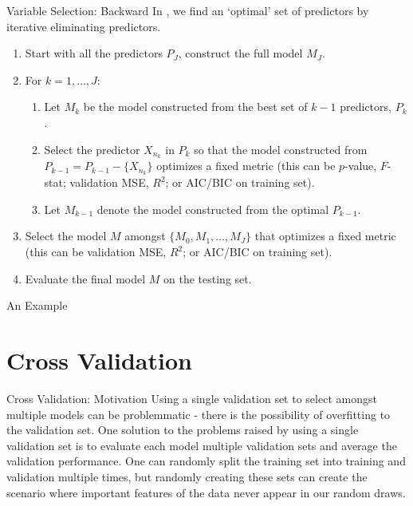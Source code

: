 \documentclass[12pt,t]{beamer}
\let\emph\relax %
\begin{document}
\begin{frame}{Variable Selection: Backward} \footnotesize
\vskip-0.4cm
In \emph{backward selection}, we find an `optimal' set of predictors by iterative eliminating predictors.
\vskip0.1cm
\begin{enumerate}
\item Start with all the predictors $P_J$, construct the full model $M_J$.
\vskip0.2cm
\item For $k = 1, \ldots, J$:
\begin{enumerate}
\item Let $M_{k}$ be the model constructed from the best set of $k-1$ predictors, $P_{k}$.
\vskip0.1cm 
\item Select the predictor $X_{n_{k}}$ in $P_{k}$ so that the model constructed from $P_{k-1} = P_{k-1}- \{X_{n_{k}}\}$ optimizes a fixed metric (this can be $p$-value, $F$-stat; validation MSE, $R^2$; or AIC/BIC on training set). 
\vskip0.1cm
\item Let $M_{k-1}$ denote the model constructed from the optimal $P_{k-1}$. 
\end{enumerate}
\item Select the model $M$ amongst $\{M_0, M_1, \ldots, M_J\}$ that optimizes a fixed metric (this can be validation MSE, $R^2$; or AIC/BIC on training set). 
\vskip0.2cm
\item Evaluate the final model  $M$ on the testing set.
\end{enumerate}
\end{frame}


\begin{frame}{An Example}
\end{frame}

\section{Cross Validation}

\begin{frame}{Cross Validation: Motivation} 
Using a single validation set to select amongst multiple models can be problemmatic - there is the possibility of overfitting to the validation set. 
\vskip0.4cm
One solution to the problems raised by using a single validation set is to evaluate each model multiple validation sets and average the validation performance. 
\vskip0.4cm
One can randomly split the training set into training and validation multiple times, but randomly creating these sets can create the scenario where important features of the data never appear in our random draws. 
\end{frame}
\end{document}
